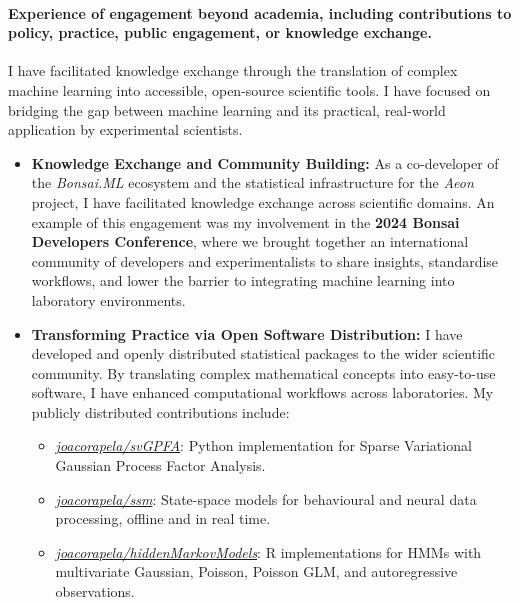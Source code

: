 \documentclass{article}
\begin{document}
\paragraph{Experience of engagement beyond academia, including contributions to
policy, practice, public engagement, or knowledge exchange.}

I have facilitated knowledge exchange through the translation of complex
machine learning into accessible, open-source scientific tools. I have focused
on bridging the gap between machine learning and its practical, real-world
application by experimental scientists.

\begin{itemize}

    \item \textbf{Knowledge Exchange and Community Building:} As a co-developer
        of the \textit{Bonsai.ML} ecosystem and the statistical infrastructure
        for the \textit{Aeon} project, I have facilitated
        knowledge exchange across scientific domains. An example of this
        engagement was my involvement in the \textbf{2024 Bonsai Developers
        Conference}, where we brought together an international community of
        developers and experimentalists to share insights, standardise
        workflows, and lower the barrier to integrating machine learning into
        laboratory environments.

    \item \textbf{Transforming Practice via Open Software Distribution:} I have
        developed and openly distributed statistical packages to the wider
        scientific community. By translating complex mathematical concepts into
        easy-to-use software, I have enhanced computational workflows across
        laboratories. My publicly distributed contributions include:

    \begin{itemize}

        \item
            \href{https://github.com/joacorapela/svGPFA}{\textit{joacorapela/svGPFA}}:
            Python implementation for Sparse Variational Gaussian Process
            Factor Analysis.

        \item
            \href{https://github.com/joacorapela/ssm}{\textit{joacorapela/ssm}}:
            State-space models for behavioural and neural data processing, offline
            and in real time.

        \item
            \href{https://github.com/joacorapela/hiddenMarkovModels}{\textit{joacorapela/hiddenMarkovModels}}:
            R implementations for HMMs with multivariate Gaussian, Poisson,
            Poisson GLM, and autoregressive observations.


\end{itemize}
\end{itemize}
\end{document}
